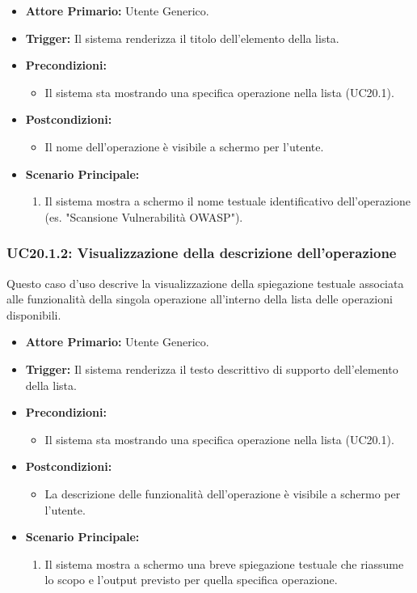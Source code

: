 \documentclass[12pt, a4paper]{article}
\begin{document}
\begin{itemize}
    \item \textbf{Attore Primario:} Utente Generico.
    \item \textbf{Trigger:} Il sistema renderizza il titolo dell'elemento della lista.
    \item \textbf{Precondizioni:} 
    \begin{itemize}
        \item Il sistema sta mostrando una specifica operazione nella lista (UC20.1).
    \end{itemize}
    \item \textbf{Postcondizioni:}
    \begin{itemize}
        \item Il nome dell'operazione è visibile a schermo per l'utente.
    \end{itemize}
    \item \textbf{Scenario Principale:}
    \begin{enumerate}
        \item Il sistema mostra a schermo il nome testuale identificativo dell'operazione (es. "Scansione Vulnerabilità OWASP").
    \end{enumerate}
\end{itemize}


\subsubsection{UC20.1.2: Visualizzazione della descrizione dell'operazione}\label{uc:20.1.2}
Questo caso d'uso descrive la visualizzazione della spiegazione testuale associata alle funzionalità della singola operazione all'interno della lista delle operazioni disponibili.

\begin{itemize}
    \item \textbf{Attore Primario:} Utente Generico.
    \item \textbf{Trigger:} Il sistema renderizza il testo descrittivo di supporto dell'elemento della lista.    
    \newpage
    \item \textbf{Precondizioni:} 
    \begin{itemize}
        \item Il sistema sta mostrando una specifica operazione nella lista (UC20.1).
    \end{itemize}
    \item \textbf{Postcondizioni:}
    \begin{itemize}
        \item La descrizione delle funzionalità dell'operazione è visibile a schermo per l'utente.
    \end{itemize}
    \item \textbf{Scenario Principale:}
    \begin{enumerate}
        \item Il sistema mostra a schermo una breve spiegazione testuale che riassume lo scopo e l'output previsto per quella specifica operazione.
    \end{enumerate}
\end{itemize}
\end{document}
